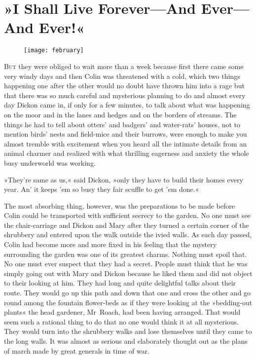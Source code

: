 \chapter{»I Shall Live Forever—And Ever—And Ever!«}
	
\begin{figure}[t!]
\centering
\texttt{[image: february]}
\end{figure}

	\lettrine[lines=6]{B}{ut} they were obliged to wait more than a week because first there came some very windy days and then Colin was threatened with a cold, which two things happening one after the other would no doubt have thrown him into a rage but that there was so much careful and mysterious planning to do and almost every day Dickon came in, if only for a few minutes, to talk about what was happening on the moor and in the lanes and hedges and on the borders of streams. The things he had to tell about otters' and badgers' and water-rats' houses, not to mention birds' nests and field-mice and their burrows, were enough to make you almost tremble with excitement when you heard all the intimate details from an animal charmer and realized with what thrilling eagerness and anxiety the whole busy underworld was working.

»They're same as us,« said Dickon, »only they have to build their homes every year. An' it keeps 'em so busy they fair scuffle to get 'em done.«

The most absorbing thing, however, was the preparations to be made before Colin could be transported with sufficient secrecy to the garden. No one must see the chair-carriage and Dickon and Mary after they turned a certain corner of the shrubbery and entered upon the walk outside the ivied walls. As each day passed, Colin had become more and more fixed in his feeling that the mystery surrounding the garden was one of its greatest charms. Nothing must spoil that. No one must ever suspect that they had a secret. People must think that he was simply going out with Mary and Dickon because he liked them and did not object to their looking at him. They had long and quite delightful talks about their route. They would go up this path and down that one and cross the other and go round among the fountain flower-beds as if they were looking at the »bedding-out plants« the head gardener, Mr~Roach, had been having arranged. That would seem such a rational thing to do that no one would think it at all mysterious. They would turn into the shrubbery walks and lose themselves until they came to the long walls. It was almost as serious and elaborately thought out as the plans of march made by great generals in time of war.

